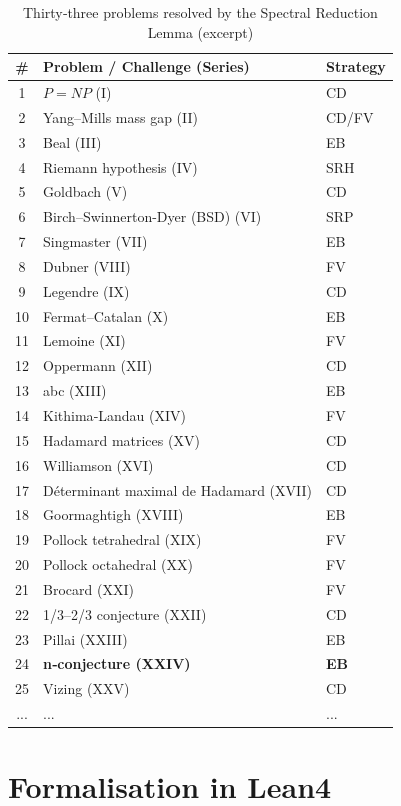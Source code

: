 \documentclass[11pt,a4paper]{article}
\begin{document}
\begin{center}
\small
\begin{longtable}{@{}cll@{}}
\caption{Thirty‑three problems resolved by the Spectral Reduction Lemma (excerpt)}\\
\toprule
\# & Problem / Challenge (Series) & Strategy \\
\midrule
1 & \(P = NP\) (I) & CD \\
2 & Yang–Mills mass gap (II) & CD/FV \\
3 & Beal (III) & EB \\
4 & Riemann hypothesis (IV) & SRH \\
5 & Goldbach (V) & CD \\
6 & Birch–Swinnerton-Dyer (BSD) (VI) & SRP \\
7 & Singmaster (VII) & EB \\
8 & Dubner (VIII) & FV \\
9 & Legendre (IX) & CD \\
10 & Fermat–Catalan (X) & EB \\
11 & Lemoine (XI) & FV \\
12 & Oppermann (XII) & CD \\
13 & abc (XIII) & EB \\
14 & Kithima‑Landau (XIV) & FV \\
15 & Hadamard matrices (XV) & CD \\
16 & Williamson (XVI) & CD \\
17 & Déterminant maximal de Hadamard (XVII) & CD \\
18 & Goormaghtigh (XVIII) & EB \\
19 & Pollock tetrahedral (XIX) & FV \\
20 & Pollock octahedral (XX) & FV \\
21 & Brocard (XXI) & FV \\
22 & 1/3–2/3 conjecture (XXII) & CD \\
23 & Pillai (XXIII) & EB \\
24 & \textbf{n‑conjecture (XXIV)} & \textbf{EB} \\
25 & Vizing (XXV) & CD \\
... & ... & ... \\
\bottomrule
\end{longtable}
\end{center}

\section{Formalisation in Lean4}
\end{document}
